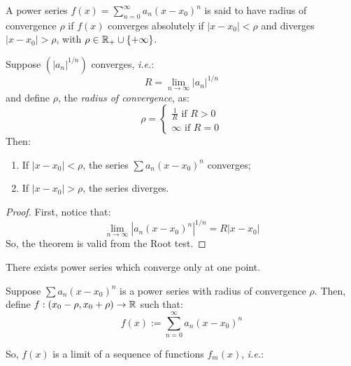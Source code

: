 \begin{definition}
    A power series $f(x) = \sum_{n=0}^\infty a_n(x - x_0)^n$ is said to have radius of convergence $\rho$ if $f(x)$ converges absolutely if $|x-x_0| < \rho$ and diverges $|x - x_0| > \rho$, with $\rho \in \mathbb{R}_+\cup \{ +\infty\}$.
\end{definition}

\begin{theorem}
    Suppose $(|a_n|^{1/n})$ converges, \emph{i.e.}:
    \begin{equation*}
        R = \lim \limits_{n \to \infty} |a_n|^{1/n}
    \end{equation*}
    and define $\rho$, the \emph{radius of convergence}, as:
    \begin{equation*}
        \rho = \begin{cases}
            \frac{1}{R} \text{ if } R > 0 \\
            \infty \text{ if } R = 0
        \end{cases}
    \end{equation*}
    Then:
    \begin{enumerate}
        \item If $|x-x_0| < \rho$, the series $\sum a_n(x - x_0)^n$ converges;
        \item If $|x-x_0| > \rho$, the series diverges.
    \end{enumerate}
\end{theorem}

\begin{proof}
    First, notice that:
    \begin{equation*}
        \lim \limits_{n \to \infty} |a_n(x-x_0)^n|^{1/n} = R |x-x_0|
    \end{equation*}
    So, the theorem is valid from the Root test.
\end{proof}

\begin{remark}
    There exists power series which converge only at one point.
\end{remark}

Suppose $\sum a_n(x-x_0)^n$ is a power series with radius of convergence $\rho$. Then, define $f: (x_0 - \rho, x_0 + \rho) \to \mathbb{R}$ such that:
\begin{equation*}
    f(x) := \sum \limits_{n=0}^\infty a_n (x - x_0)^n
\end{equation*}

So, $f(x)$ is a limit of a sequence of functions $f_m(x)$, \emph{i.e.}:

